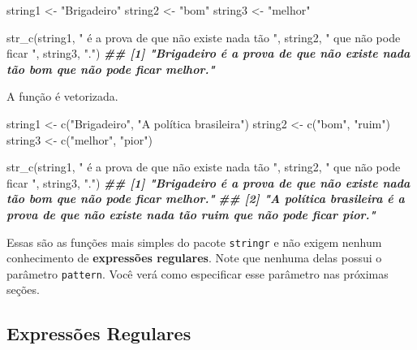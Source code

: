 \documentclass[
]{book}
\newenvironment{Shaded}{\begin{snugshade}}{\end{snugshade}}
\newcommand{\DocumentationTok}[1]{\textcolor[rgb]{0.56,0.35,0.01}{\textbf{\textit{#1}}}}
\newcommand{\FunctionTok}[1]{\textcolor[rgb]{0.00,0.00,0.00}{#1}}
\newcommand{\NormalTok}[1]{#1}
\newcommand{\OtherTok}[1]{\textcolor[rgb]{0.56,0.35,0.01}{#1}}
\newcommand{\StringTok}[1]{\textcolor[rgb]{0.31,0.60,0.02}{#1}}
\begin{document}
\begin{Shaded}
\begin{Highlighting}[]
\NormalTok{string1 }\OtherTok{\textless{}{-}} \StringTok{"Brigadeiro"}
\NormalTok{string2 }\OtherTok{\textless{}{-}} \StringTok{"bom"}
\NormalTok{string3 }\OtherTok{\textless{}{-}} \StringTok{"melhor"}

\FunctionTok{str\_c}\NormalTok{(string1, }\StringTok{" é a prova de que não existe nada tão "}\NormalTok{, string2,}
      \StringTok{" que não pode ficar "}\NormalTok{, string3, }\StringTok{"."}\NormalTok{)}
\DocumentationTok{\#\# [1] "Brigadeiro é a prova de que não existe nada tão bom que não pode ficar melhor."}
\end{Highlighting}
\end{Shaded}

A função é vetorizada.

\begin{Shaded}
\begin{Highlighting}[]
\NormalTok{string1 }\OtherTok{\textless{}{-}} \FunctionTok{c}\NormalTok{(}\StringTok{"Brigadeiro"}\NormalTok{, }\StringTok{"A política brasileira"}\NormalTok{)}
\NormalTok{string2 }\OtherTok{\textless{}{-}} \FunctionTok{c}\NormalTok{(}\StringTok{"bom"}\NormalTok{, }\StringTok{"ruim"}\NormalTok{)}
\NormalTok{string3 }\OtherTok{\textless{}{-}} \FunctionTok{c}\NormalTok{(}\StringTok{"melhor"}\NormalTok{, }\StringTok{"pior"}\NormalTok{)}

\FunctionTok{str\_c}\NormalTok{(string1, }\StringTok{" é a prova de que não existe nada tão "}\NormalTok{, string2,}
      \StringTok{" que não pode ficar "}\NormalTok{, string3, }\StringTok{"."}\NormalTok{)}
\DocumentationTok{\#\# [1] "Brigadeiro é a prova de que não existe nada tão bom que não pode ficar melhor."          }
\DocumentationTok{\#\# [2] "A política brasileira é a prova de que não existe nada tão ruim que não pode ficar pior."}
\end{Highlighting}
\end{Shaded}

Essas são as funções mais simples do pacote \texttt{stringr} e não exigem nenhum conhecimento de \textbf{expressões regulares}. Note que nenhuma delas possui o parâmetro \texttt{pattern}. Você verá como especificar esse parâmetro nas próximas seções.

\hypertarget{expressuxf5es-regulares}{%
\subsection{Expressões Regulares}\label{expressuxf5es-regulares}}
\end{document}

